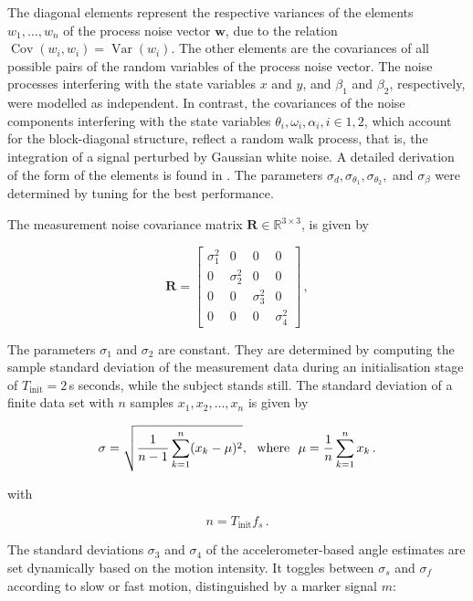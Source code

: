 \noindent
The diagonal elements represent the respective variances of the elements $w_1, \dots, w_n$ of the process noise vector $\mathbf{w}$, due to the relation $\operatorname{Cov}(w_i,w_i) = \operatorname{Var}(w_i)$. The other elements are the covariances of all possible pairs of the random variables of the process noise vector. The noise processes interfering with the state variables $x$ and $y$, and $\beta_1$ and $\beta_2$, respectively, were modelled as independent. In contrast, the covariances of the noise components interfering with the state variables $\theta_i, \omega_i, \alpha_i, i \in {1, 2}$, which account for the block-diagonal structure, reflect a random walk process, that is, the integration of a signal perturbed by Gaussian white noise. A detailed derivation of the form of the elements is found in \cite{Kelly_1994_random}. The parameters $\sigma_d, \sigma_{\theta_1}, \sigma_{\theta_2},$ and $\sigma_{\beta}$ were determined by tuning for the best performance.

The measurement noise covariance matrix $\mathbf{R} \in \mathbb{R}^{3 \times 3}$, is given by

\begin{equation}
\mathbf{R} = \begin{bmatrix}
  \sigma^2_1 & 0 & 0 & 0\\
  0 & \sigma^2_2 & 0 & 0\\
  0 & 0 & \sigma^2_3 & 0\\
  0 & 0 & 0 & \sigma^2_4
\end{bmatrix}\,,
\end{equation}

The parameters $\sigma_1$ and $\sigma_2$ are constant. They are determined by computing the sample standard deviation of the measurement data during an initialisation stage of $T_{\text{init}} = 2$\,s seconds, while the subject stands still. The standard deviation of a finite data set with $n$ samples $x_1, x_2, \dots, x_n$ is given by

\begin{equation}
  \sigma = \sqrt{\frac{1}{n-1} \sum_{k=1}^n (x_k - \mu)^2}, {\rm \ \ where\ \ } \mu = \frac{1}{n} \sum_{k=1}^n x_k\,.
\end{equation}

\noindent
with

\begin{equation}
  n = T_{\text{init}} f_s\,.
\end{equation}


\noindent
The standard deviations $\sigma_3$ and $\sigma_4$ of the accelerometer-based angle estimates are set dynamically based on the motion intensity. It toggles between $\sigma_s$ and $\sigma_f$ according to slow or fast motion, distinguished by a marker signal $m$:

